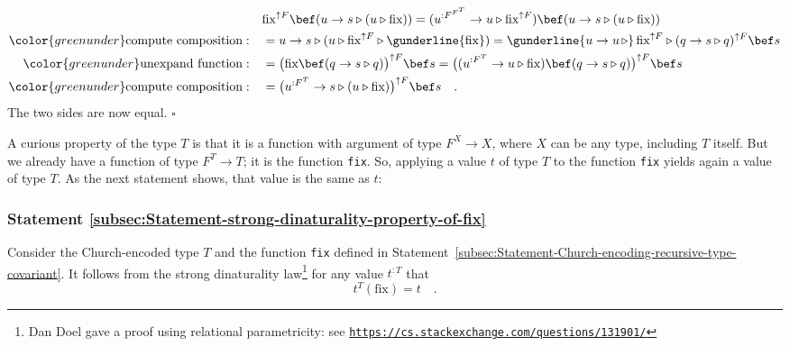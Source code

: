 \begin{align*}
 & \text{fix}^{\uparrow F}\bef(u\rightarrow s\triangleright(u\triangleright\text{fix}))=(u^{:F^{F^{T}}}\rightarrow u\triangleright\text{fix}^{\uparrow F})\bef(u\rightarrow s\triangleright(u\triangleright\text{fix}))\\
{\color{greenunder}\text{compute composition}:}\quad & =u\rightarrow s\triangleright(u\triangleright\text{fix}^{\uparrow F}\triangleright\gunderline{\text{fix}})=\gunderline{u\rightarrow u\,\triangleright}\,\text{fix}^{\uparrow F}\triangleright(q\rightarrow s\triangleright q)^{\uparrow F}\bef s\\
{\color{greenunder}\text{unexpand function}:}\quad & =\big(\text{fix}\bef(q\rightarrow s\triangleright q)\big)^{\uparrow F}\bef s=\big((u^{:F^{T}}\rightarrow u\triangleright\text{fix})\bef(q\rightarrow s\triangleright q)\big)^{\uparrow F}\bef s\\
{\color{greenunder}\text{compute composition}:}\quad & =\big(u^{:F^{T}}\rightarrow s\triangleright(u\triangleright\text{fix})\big)^{\uparrow F}\bef s\quad.
\end{align*}
The two sides are now equal. $\square$

A curious property of the type $T$ is that it is a function with
argument of type $F^{X}\rightarrow X$, where $X$ can be any type,
including $T$ itself. But we already have a function of type $F^{T}\rightarrow T$;
it is the function \lstinline!fix!.
So, applying a value $t$ of type $T$ to the function \lstinline!fix!
yields again a value of type $T$. As the next statement shows, that
value is the same as $t$:

\subsubsection{Statement \label{subsec:Statement-strong-dinaturality-property-of-fix}\ref{subsec:Statement-strong-dinaturality-property-of-fix}}

Consider the Church-encoded type $T$ and the function \lstinline!fix!
defined in Statement~\ref{subsec:Statement-Church-encoding-recursive-type-covariant}.
It follows from the strong dinaturality law\footnote{Dan Doel gave a proof using relational parametricity:
see \texttt{\href{https://cs.stackexchange.com/questions/131901/}{https://cs.stackexchange.com/questions/131901/}}} for any value $t^{:T}$ that 
\begin{equation}
t^{T}(\text{fix})=t\quad.\label{eq:fix-unfix-property-of-T}
\end{equation}


